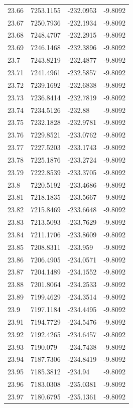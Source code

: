 \begin{table}[H]
\begin{tabular}{llll}
23.66 & 7253.1155 & -232.0953 & -9.8092 \\
23.67 & 7250.7936 & -232.1934 & -9.8092 \\
23.68 & 7248.4707 & -232.2915 & -9.8092 \\
23.69 & 7246.1468 & -232.3896 & -9.8092 \\
23.7 & 7243.8219 & -232.4877 & -9.8092 \\
23.71 & 7241.4961 & -232.5857 & -9.8092 \\
23.72 & 7239.1692 & -232.6838 & -9.8092 \\
23.73 & 7236.8414 & -232.7819 & -9.8092 \\
23.74 & 7234.5126 & -232.88 & -9.8092 \\
23.75 & 7232.1828 & -232.9781 & -9.8092 \\
23.76 & 7229.8521 & -233.0762 & -9.8092 \\
23.77 & 7227.5203 & -233.1743 & -9.8092 \\
23.78 & 7225.1876 & -233.2724 & -9.8092 \\
23.79 & 7222.8539 & -233.3705 & -9.8092 \\
23.8 & 7220.5192 & -233.4686 & -9.8092 \\
23.81 & 7218.1835 & -233.5667 & -9.8092 \\
23.82 & 7215.8469 & -233.6648 & -9.8092 \\
23.83 & 7213.5093 & -233.7629 & -9.8092 \\
23.84 & 7211.1706 & -233.8609 & -9.8092 \\
23.85 & 7208.8311 & -233.959 & -9.8092 \\
23.86 & 7206.4905 & -234.0571 & -9.8092 \\
23.87 & 7204.1489 & -234.1552 & -9.8092 \\
23.88 & 7201.8064 & -234.2533 & -9.8092 \\
23.89 & 7199.4629 & -234.3514 & -9.8092 \\
23.9 & 7197.1184 & -234.4495 & -9.8092 \\
23.91 & 7194.7729 & -234.5476 & -9.8092 \\
23.92 & 7192.4265 & -234.6457 & -9.8092 \\
23.93 & 7190.079 & -234.7438 & -9.8092 \\
23.94 & 7187.7306 & -234.8419 & -9.8092 \\
23.95 & 7185.3812 & -234.94 & -9.8092 \\
23.96 & 7183.0308 & -235.0381 & -9.8092 \\
23.97 & 7180.6795 & -235.1361 & -9.8092 \\

\end{tabular}
\end{table}
